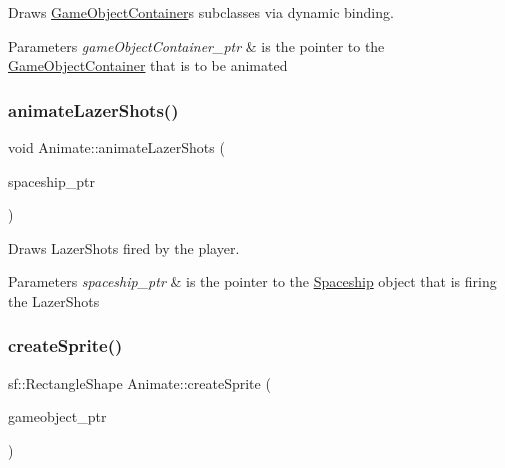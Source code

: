 Draws \mbox{\hyperlink{class_game_object_container}{Game\+Object\+Container}}\textquotesingle{}s subclasses via dynamic binding. 


\begin{DoxyParams}{Parameters}
{\em game\+Object\+Container\+\_\+ptr} & is the pointer to the \mbox{\hyperlink{class_game_object_container}{Game\+Object\+Container}} that is to be animated \\
\hline
\end{DoxyParams}
\mbox{\label{class_animate_ac5b83e2b0dcf05902210071d7863272b}} 
\subsubsection{\texorpdfstring{animate\+Lazer\+Shots()}{animateLazerShots()}}
{\footnotesize\ttfamily void Animate\+::animate\+Lazer\+Shots (\begin{DoxyParamCaption}\item[{shared\+\_\+ptr$<$ \mbox{\hyperlink{class_spaceship}{Spaceship}} $>$}]{spaceship\+\_\+ptr }\end{DoxyParamCaption})}



Draws Lazer\+Shots fired by the player. 


\begin{DoxyParams}{Parameters}
{\em spaceship\+\_\+ptr} & is the pointer to the \mbox{\hyperlink{class_spaceship}{Spaceship}} object that is firing the Lazer\+Shots \\
\hline
\end{DoxyParams}
\mbox{\label{class_animate_a837bb2a4b1929fe538408c8d89de1969}} 
\subsubsection{\texorpdfstring{create\+Sprite()}{createSprite()}}
{\footnotesize\ttfamily sf\+::\+Rectangle\+Shape Animate\+::create\+Sprite (\begin{DoxyParamCaption}\item[{shared\+\_\+ptr$<$ \mbox{\hyperlink{class_game_object}{Game\+Object}} $>$}]{gameobject\+\_\+ptr }\end{DoxyParamCaption})\hspace{0.3cm}{\ttfamily [private]}}



